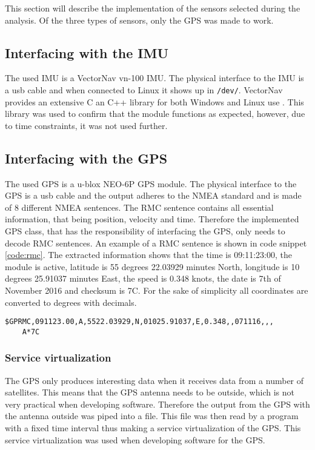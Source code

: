 \label{sub:implementation_of_sensors}
This section will describe the implementation of the sensors selected during the analysis.
Of the three types of sensors, only the GPS was made to work.



\subsection{Interfacing with the IMU}\label{sec:interface_IMU}
The used IMU is a VectorNav vn-100 IMU.
The physical interface to the IMU is a usb cable and when connected to Linux it shows up in \texttt{/dev/}.
VectorNav provides an extensive C an C++ library for both Windows and Linux use \cite{vectornav}. 
This library was used to confirm that the module functions as expected, however, due to time constraints, it was not used further.
\subsection{Interfacing with the GPS}\label{sec:interface_GPS}
The used GPS is a u-blox NEO-6P GPS module.
The physical interface to the GPS is a usb cable and the output adheres to the NMEA standard and is made of 8 different NMEA sentences.
The RMC sentence contains all essential information, that being position, velocity and time.
Therefore the implemented GPS class, that has the responsibility of interfacing the GPS, only needs to decode RMC sentences.
An example of a RMC sentence is shown in code snippet \ref{code:rmc}.
The extracted information shows that the time is 09:11:23:00, the module is active, latitude is 55 degrees 22.03929 minutes North, longitude is 10 degrees 25.91037 minutes East, the speed is 0.348 knots, the date is  7th of November 2016 and checksum is 7C.
For the sake of simplicity all coordinates are converted to degrees with decimals. 
\begin{lstlisting}[caption=RMC sentence.,label=code:rmc]
$GPRMC,091123.00,A,5522.03929,N,01025.91037,E,0.348,,071116,,,
	A*7C
\end{lstlisting}

\subsubsection*{Service virtualization}
The GPS only produces interesting data when it receives data from a number of satellites. 
This means that the GPS antenna needs to be outside, which is not very practical when developing software.
Therefore the output from the GPS with the antenna outside was piped into a file.
This file was then read by a program with a fixed time interval thus making a service virtualization of the GPS.
This service virtualization was used when developing software for the GPS.